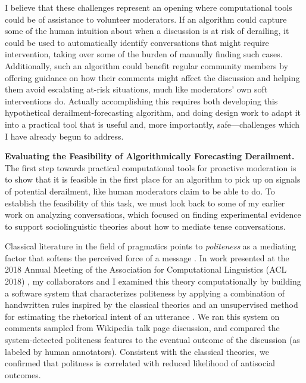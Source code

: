 \documentclass[11pt,letterpaper]{article}
\renewcommand{\section}[1]{\vspace{0.25\baselineskip}\noindent\textbf{#1.}}
\begin{document}
I believe that these challenges represent an opening where computational tools could be of assistance to volunteer moderators.
If an algorithm could capture some of the human intuition about when a discussion is at risk of derailing, it could be used to automatically identify conversations that might require intervention, taking over some of the burden of manually finding such cases.
Additionally, such an algorithm could benefit regular community members by offering guidance on how their comments might affect the discussion and helping them avoid escalating at-risk situations, much like moderators' own soft interventions do.
Actually accomplishing this requires both developing this hypothetical derailment-forecasting algorithm, and doing design work to adapt it into a practical tool that is useful and, more importantly, safe---challenges which I have already begun to address.

\section{Evaluating the Feasibility of Algorithmically Forecasting Derailment}
The first step towards practical computational tools for proactive moderation is to show that it is feasible in the first place for an algorithm to pick up on signals of potential derailment, like human moderators claim to be able to do.
To establish the feasibility of this task, we must look back to some of my earlier work on analyzing conversations, which focused on finding experimental evidence to support sociolinguistic theories about how to mediate tense conversations.

Classical literature in the field of pragmatics points to \emph{politeness} as a mediating factor that softens the perceived force of a message \cite{brown_politeness:_1987,clark_polite_1980-1}.
In work presented at the 2018 Annual Meeting of the Association for Computational Linguistics (ACL 2018) \cite{zhang_conversations_2018}, my collaborators and I examined this theory computationally by building a software system that characterizes politeness by applying a combination of handwritten rules inspired by the classical theories \cite{danescu-niculescu-mizil_computational_2013} and an unsupervised method for estimating the rhetorical intent of an utterance \cite{zhang_asking_2017}.
We ran this system on comments sampled from Wikipedia talk page discussion, and compared the system-detected politeness features to the eventual outcome of the discussion (as labeled by human annotators).
Consistent with the classical theories, we confirmed that politness is correlated with reduced likelihood of antisocial outcomes.
\end{document}
